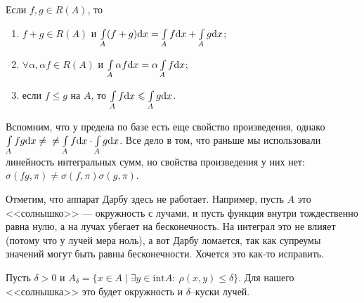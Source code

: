 \begin{Consequence}
Если $f, g \in R(A)$, то
\begin{enumerate}
\item $f + g \in R(A)$ и $\int\limits_A(f + g)\mathrm{d} x = \int\limits_A f \mathrm{d} x + \int\limits_Ag \mathrm{d} x$;
\item $\forall \alpha, \alpha f \in R(A)$ и $\int\limits_A\alpha f \mathrm{d} x = \alpha \int\limits_A f \mathrm{d} x$;
\item если $f \leq g$ на $A$, то $\int\limits_A f \mathrm{d} x \leqslant \int\limits_A g \mathrm{d} x$.
\end{enumerate}
\end{Consequence}

Вспомним, что у предела по базе есть еще свойство произведения, однако $\int\limits_A fg \mathrm{d} x \neq\\\neq \int\limits_A f\mathrm{d} x \cdot \int\limits_A g \mathrm{d} x$. Все дело в том, что раньше мы использовали линейность интегральных сумм, но свойства произведения у них нет: $\sigma(fg, \pi) \neq \sigma(f, \pi)\sigma(g, \pi)$.

Отметим, что аппарат Дарбу здесь не работает. Например, пусть $A$ это <<солнышко>> --- окружность с лучами, и пусть функция внутри тождественно равна нулю, а на лучах убегает на бесконечность. На интеграл это не влияет (потому что у лучей мера ноль), а вот Дарбу ломается, так как супреумы значений могут быть равны бесконечности. Хочется это как-то исправить.

Пусть $\delta > 0$ и $A_\delta = \{ x \in A \mid \exists y \in \mathrm{int}A:\ \rho(x, y) \leq \delta \}$. Для нашего <<солнышка>> это будет окружность и $\delta$--куски лучей.

